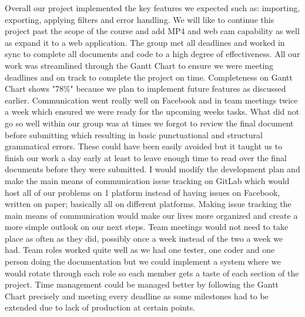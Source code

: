 \documentclass{article}
\begin{document}
\indent Overall our project implemented the key features we expected such as: importing, exporting, applying filters and error handling. We will like to continue this project past the scope of the course and add MP4 and web cam capability as well as expand it to a web application. The group met all deadlines and worked in sync to complete all documents and code to a high degree of effectiveness. All our work was streamlined through the Gantt Chart to ensure we were meeting deadlines and on track to complete the project on time. Completeness on Gantt Chart shows "78\%"  because we plan to implement future features as discussed earlier. Communication went really well on Facebook and in team meetings twice a week which ensured we were ready for the upcoming weeks tasks. What did not go so well within our group was at times we forgot to review the final document before submitting which resulting in basic punctuational and structural grammatical errors. These could have been easily avoided but it taught us to finish our work a day early at least to leave enough time to read over the final documents before they were submitted. I would modify the development plan and make the main means of communication issue tracking on GitLab which would host all of our problems on 1 platform instead of having issues on Facebook, written on paper; basically all on different platforms. Making issue tracking the main means of communication would make our lives more organized and create a more simple outlook on our next steps. Team meetings would not need to take place as often as they did, possibly once a week instead of the two a week we had. Team roles worked quite well as we had one tester, one coder and one person doing the documentation but we could implement a system where we would rotate through each role so each member gets a taste of each section of the project. Time management could be managed better by following the Gantt Chart precisely and meeting every deadline as some milestones had to be extended due to lack of production at certain points.
\end{document}
